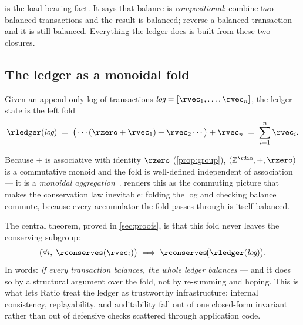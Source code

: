  is the load-bearing fact. It says that balance is
\emph{compositional}: combine two balanced transactions and the result
is balanced; reverse a balanced transaction and it is still balanced.
Everything the ledger does is built from these two closures.

\subsection{The ledger as a monoidal fold}

\begin{definition}[Ledger]
\label{def:ledger}
Given an append-only log of transactions
$\textit{log} = [\rvec_1, \dots, \rvec_n]$, the ledger state is the
left fold
\[
  \rledger(\textit{log}) \;=\;
  \big(\cdots(\rzero + \rvec_1) + \rvec_2 \cdots\big) + \rvec_n
  \;=\; \sum_{i=1}^{n} \rvec_i .
\]
\end{definition}

Because $+$ is associative with identity $\rzero$
(\cref{prop:group}), $(\mathbb{Z}^{\rdim}, +, \rzero)$ is a commutative
monoid and the fold is well-defined independent of association --- it is
a \emph{monoidal aggregation}~\cite{hutton1999fold}.  renders this as the
commuting picture that makes the conservation law inevitable: folding the
log and checking balance commute, because every accumulator the fold
passes through is itself balanced.



The central theorem, proved in \cref{sec:proofs}, is that this fold never
leaves the conserving subgroup:
\[
  \big(\forall i,\; \rconserves(\rvec_i)\big)
  \;\Longrightarrow\;
  \rconserves\!\big(\rledger(\textit{log})\big).
\]
In words: \emph{if every transaction balances, the whole ledger
balances} --- and it does so by a structural argument over the fold, not
by re-summing and hoping. This is what lets Ratio treat the ledger as
trustworthy infrastructure: internal consistency, replayability, and
auditability fall out of one closed-form invariant rather than out of
defensive checks scattered through application code.
